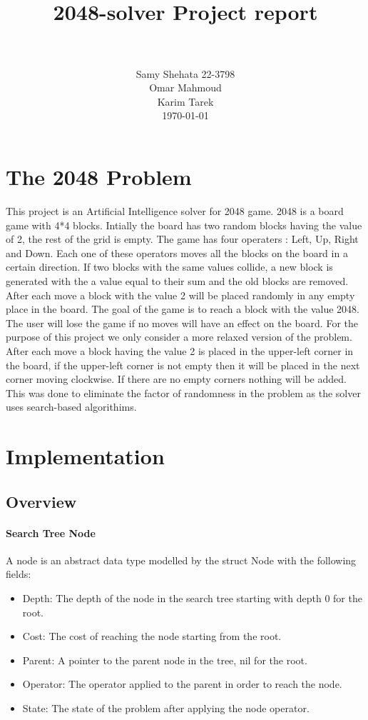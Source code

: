 \documentclass[paper=a4, fontsize=11pt]{scrartcl}
\title{
		\usefont{OT1}{bch}{b}{n}
		\normalfont \normalsize \textsc{} \\ [25pt]
		\horrule{0.5pt} \\[0.4cm]
		\huge 2048-solver Project report \\
		\horrule{2pt} \\[0.5cm]
}
\author{
		\normalfont 								\normalsize
        Samy Shehata 22-3798\\[-3pt]		\normalsize
        Omar Mahmoud \\[-3pt]		\normalsize
        Karim Tarek \\[-3pt]		\normalsize
        \today
}
\date{}
\numberwithin{equation}{section}		%
\numberwithin{figure}{section}			%
\numberwithin{table}{section}				%
\begin{document}
\maketitle
\section{The 2048 Problem}
This project is an Artificial Intelligence solver for 2048 game. 2048 is a board game with 4*4 blocks. Intially the  board has two random blocks having the value of 2, the rest of the grid is empty. The game has four operaters : Left, Up, Right and Down. Each one of these operators moves all the blocks on the board in a certain direction. If two blocks with the same values collide, a new block is generated with the a value equal to their sum and the old blocks are removed. After each move a block with the value 2 will be placed randomly in any empty place in the board. The goal of the game is to reach a block with the value 2048. The user will lose the game if no moves will have an effect on the board. For the purpose of this project we only consider a more relaxed version of the problem. After each move a block having the value 2 is placed in the upper-left corner in the board, if the upper-left corner is not empty then it will be placed in the next corner moving clockwise. If there are no empty corners nothing will be added. This was done to eliminate the factor of randomness in the problem as the solver uses search-based algorithims. 

\section{Implementation}
\subsection{Overview}

\paragraph{Search Tree Node}
A node is an abstract data type modelled by the struct Node with the following fields:
\begin{itemize}
	\item{Depth:} The depth of the node in the search tree starting with depth 0 for the root.
    \item{Cost:} The cost of reaching the node starting from the root.
	\item{Parent:} A pointer to the parent node in the tree, nil for the root.	
	\item{Operator:} The operator applied to the parent in order to reach the node.
	\item{State:} The state of the problem after applying the node operator.
\end{itemize}
\end{document}
